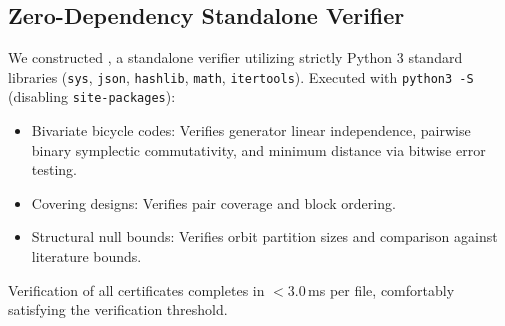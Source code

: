 \documentclass[11pt,a4paper]{article}
\begin{document}
\subsection{Zero-Dependency Standalone Verifier}
\label{sec:standalone}
We constructed , a standalone verifier utilizing strictly Python 3 standard libraries (\texttt{sys}, \texttt{json}, \texttt{hashlib}, \texttt{math}, \texttt{itertools}). Executed with \texttt{python3 -S} (disabling \texttt{site-packages}):
\begin{itemize}
    \item Bivariate bicycle codes: Verifies generator linear independence, pairwise binary symplectic commutativity, and minimum distance via bitwise error testing.
    \item Covering designs: Verifies pair coverage and block ordering.
    \item Structural null bounds: Verifies orbit partition sizes and comparison against literature bounds.
\end{itemize}
Verification of all certificates completes in $< 3.0$\,ms per file, comfortably satisfying the verification threshold.
\end{document}
